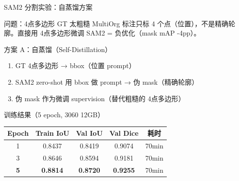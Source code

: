 \documentclass[aspectratio=169, 10pt]{beamer}
\begin{document}
\begin{frame}{SAM2 分割实验：自蒸馏方案}
  \begin{block}{问题：4点多边形 GT 太粗糙}
    MultiOrg 标注只标 4 个点（位置），不是精确轮廓。直接用 4点多边形微调 SAM2 = 负优化（mask mAP -4pp）。
  \end{block}
  \vspace{0em}
  \begin{block}{方案 A：自蒸馏（Self-Distillation）}
    \begin{enumerate}
      \item GT 4点多边形 → bbox（位置 prompt）
      \item SAM2 zero-shot 用 bbox 做 prompt → 伪 mask（精确轮廓）
      \item 伪 mask 作为微调 supervision（替代粗糙的 4点多边形）
    \end{enumerate}
  \end{block}
  \vspace{0em}
  \begin{block}{训练结果（5 epoch, 3060 12GB）}
    \begin{tabular}{ccccc}
      \toprule
      Epoch & Train IoU & Val IoU & Val Dice & 耗时 \\
      \midrule
      1 & 0.8437 & 0.8419 & 0.9074 & 70min \\
      3 & 0.8646 & 0.8594 & 0.9181 & 70min \\
      \textbf{5} & \textbf{0.8814} & \textbf{0.8720} & \textbf{0.9255} & 70min \\
      \bottomrule
    \end{tabular}
  \end{block}
\end{frame}
\end{document}
